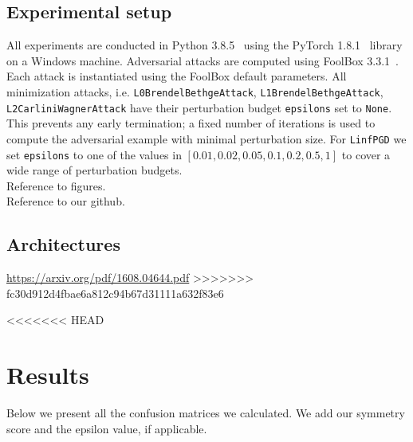 \documentclass{article}
\begin{document}
\subsection{Experimental setup}
All experiments are conducted in Python 3.8.5~\cite{van1995python} using the PyTorch 1.8.1~\cite{pytorch} library on a Windows machine. Adversarial attacks are computed using FoolBox 3.3.1~\cite{rauber2017foolbox}. Each attack is instantiated using the FoolBox default parameters. All minimization attacks, i.e. \texttt{L0BrendelBethgeAttack}, \texttt{L1BrendelBethgeAttack}, \texttt{L2CarliniWagnerAttack} have their perturbation budget \texttt{epsilons} set to \texttt{None}. This prevents any early termination; a fixed number of iterations is used to compute the adversarial example with minimal perturbation size. For \texttt{LinfPGD} we set \texttt{epsilons} to one of the values in $[0.01, 0.02, 0.05, 0.1, 0.2, 0.5, 1]$ to cover a wide range of perturbation budgets.\\

\noindent Reference to figures.\\
Reference to our github.

\subsection{Architectures}
\url{https://arxiv.org/pdf/1608.04644.pdf}
>>>>>>> fc30d912d4fbae6a812c94b67d31111a632f83e6

<<<<<<< HEAD
\section{Results}
Below we present all the confusion matrices we calculated. We add our symmetry score and the epsilon value, if applicable.
\end{document}

